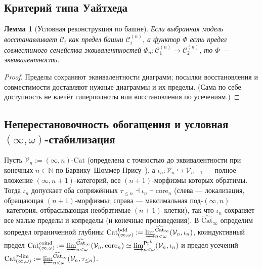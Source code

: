 \documentclass[11pt]{article}
\theoremstyle{plain}
\newtheorem{lemma}[theorem]{Лемма}
\theoremstyle{definition}
\newcommand{\cC}{\mathcal{C}}
\newcommand{\Cat}{\mathrm{Cat}}
\begin{document}
\subsection{Критерий типа Уайтхеда}

\begin{lemma}[Условная реконструкция по башне]\label{lem:whitehead}
Если выбранная модель восстанавливает $\cC_i$ как предел башни $\cC_i^{(n)}$, а функтор $\Phi$ есть предел совместимого семейства эквивалентностей $\Phi_n : \cC_1^{(n)} \to \cC_2^{(n)}$, то $\Phi$ — эквивалентность.
\end{lemma}
\begin{proof}
Пределы сохраняют эквивалентности диаграмм; посылки восстановления и совместимости доставляют нужные диаграммы и их пределы. (Сама по себе доступность не влечёт гиперполноты или восстановления по усечениям.)
\end{proof}

\subsection{Неперестановочность обогащения и условная \texorpdfstring{$(\infty, \omega)$}{(infinity, omega)}-стабилизация}

Пусть $\mathcal{V}_n := (\infty, n)\text{-}\Cat$ (определена с точностью до эквивалентности при конечных $n \in \mathbb{N}$ по Барвику--Шоммер-Прису~\cite{BarwickSchommerPries2021}), а $\iota_n : \mathcal{V}_n \hookrightarrow \mathcal{V}_{n+1}$ — полное вложение $(\infty, n+1)$-категорий, все $(n+1)$-морфизмы которых обратимы. Тогда $\iota_n$ допускает оба сопряжённых $\tau_{\le n} \dashv \iota_n \dashv \mathrm{core}_n$ (слева — локализация, обращающая $(n+1)$-морфизмы; справа — максимальная под-$(\infty, n)$-категория, отбрасывающая необратимые $(n+1)$-клетки), так что $\iota_n$ сохраняет все малые пределы и копределы (и конечные произведения). В $\widehat{\Cat}_\infty$ определим копредел ограниченной глубины $\Cat_{(\infty,\omega)}^{\mathrm{bdd}} := \varinjlim_{n < \omega}^{\widehat{\Cat}_\infty} (\mathcal{V}_n, \iota_n)$, коиндуктивный предел $\Cat_{(\infty,\omega)}^{\mathrm{coind}} := \varprojlim_{n < \omega}^{\widehat{\Cat}_\infty} (\mathcal{V}_n, \mathrm{core}_n) \simeq \varinjlim_{n < \omega}^{\mathrm{Pr}^L} (\mathcal{V}_n, \iota_n)$ и предел усечений $\Cat_{(\infty,\omega)}^{\tau\text{-}\mathrm{lim}} := \varprojlim_{n < \omega}^{\widehat{\Cat}_\infty} (\mathcal{V}_n, \tau_{\le n})$.
\end{document}
